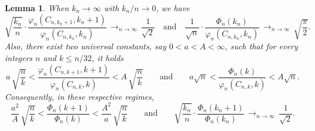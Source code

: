 \documentclass[10pt]{amsart}
\theoremstyle{plain}
\newtheorem{lemma}[theorem]{Lemma}
\theoremstyle{definition}
\theoremstyle{remark}
\newcommand{\cv}[1][n]{\,\mathop{\longrightarrow}^{}_{#1 \to \infty}\,}
\begin{document}
\begin{lemma}\label{lem:phi_et_Phi}
When $k_n\to\infty$ with $k_n/n\to0$, we have
\begin{equation}\label{eq:equiv_kn}
\sqrt{\frac{k_n}{n}} \cdot \frac{\varphi_n(C_{n,k_n+1},k_n+1)}{\varphi_n(C_{n,k_n},k_n)} \cv \frac{1}{\sqrt{2}}
\quad\text{and}\quad
\frac{1}{\sqrt{n}} \cdot \frac{\Phi_n(k_n)}{\varphi_{n}(C_{n,k_n},k_n)} \cv \sqrt{\frac{\pi}{2}}.
\end{equation}
Also, there exist two universal constants, say $0 < a < A < \infty$, such that for every integers $n$ and $k \le n/32$, it holds
\begin{equation}\label{eq:bornes_ratio}
a\,\sqrt{\frac{n}{k}} < \frac{\varphi_n(C_{n,k+1},k+1)}{\varphi_n(C_{n,k},k)} < A\,\sqrt{\frac{n}{k}}
\qquad\text{and}\qquad
a\sqrt{n} < \frac{\Phi_n(k)}{\varphi_{n}(C_{n,k},k)} < A \sqrt{n}.
\end{equation}
Consequently, in these respective regimes,
\[
\frac{a^2}{A}\,\sqrt{\frac{n}{k}}
< \frac{\Phi_n(k+1)}{\Phi_n(k)}
< \frac{A^2}{a}\,\sqrt{\frac{n}{k}}
\qquad\text{and}\qquad
\sqrt{\frac{k_n}{n}} \cdot \frac{\Phi_n(k_n+1)}{\Phi_n(k_n)} \cv \frac{1}{\sqrt{2}}.
\]
\end{lemma}
\end{document}
